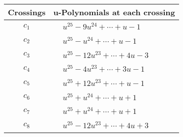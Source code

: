 \documentclass[1p]{elsarticle_modified}
\theoremstyle{definition}
\begin{document}
\begin{tabular}{m{50pt}|m{274pt}}
Crossings & \hspace{64pt}u-Polynomials at each crossing \\
\hline $$\begin{aligned}c_{1}\end{aligned}$$&$\begin{aligned}
&u^{25}-9 u^{24}+\cdots+u-1
\end{aligned}$\\
\hline $$\begin{aligned}c_{2}\end{aligned}$$&$\begin{aligned}
&u^{25}- u^{24}+\cdots+u-1
\end{aligned}$\\
\hline $$\begin{aligned}c_{3}\end{aligned}$$&$\begin{aligned}
&u^{25}-12 u^{23}+\cdots+4 u-3
\end{aligned}$\\
\hline $$\begin{aligned}c_{4}\end{aligned}$$&$\begin{aligned}
&u^{25}-4 u^{23}+\cdots+3 u-1
\end{aligned}$\\
\hline $$\begin{aligned}c_{5}\end{aligned}$$&$\begin{aligned}
&u^{25}+12 u^{23}+\cdots+u-1
\end{aligned}$\\
\hline $$\begin{aligned}c_{6}\end{aligned}$$&$\begin{aligned}
&u^{25}+u^{24}+\cdots+u+1
\end{aligned}$\\
\hline $$\begin{aligned}c_{7}\end{aligned}$$&$\begin{aligned}
&u^{25}+u^{24}+\cdots+u+1
\end{aligned}$\\
\hline $$\begin{aligned}c_{8}\end{aligned}$$&$\begin{aligned}
&u^{25}-12 u^{23}+\cdots+4 u+3
\end{aligned}$\\

\end{tabular}
\end{document}
